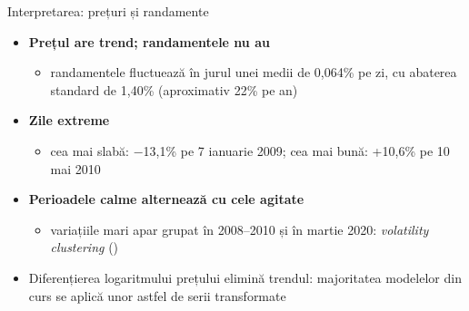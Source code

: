 \begin{frame}{Interpretarea: prețuri și randamente}
\itemsize{\small}
\begin{itemize}
    \item \textbf{Prețul are trend; randamentele nu au}
    \begin{itemize}
        \item randamentele fluctuează în jurul unei medii de 0{,}064\% pe zi, cu abaterea standard de 1{,}40\% (aproximativ 22\% pe an)
    \end{itemize}
    \item \textbf{Zile extreme}
    \begin{itemize}
        \item cea mai slabă: \ensuremath{-}13{,}1\% pe 7 ianuarie 2009; cea mai bună: +10{,}6\% pe 10 mai 2010
    \end{itemize}
    \item \textbf{Perioadele calme alternează cu cele agitate}
    \begin{itemize}
        \item variațiile mari apar grupat în 2008--2010 și în martie 2020: \emph{volatility clustering} ()
    \end{itemize}
    \item Diferențierea logaritmului prețului elimină trendul: majoritatea modelelor din curs se aplică unor astfel de serii transformate
\end{itemize}
\end{frame}

